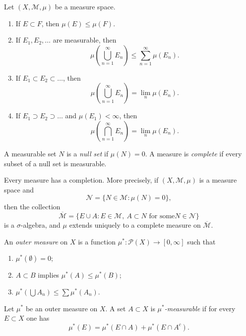 \begin{lemma}
\label{lemma-basic-properties-measures}
Let $(X,\mathcal M,\mu)$ be a measure space.
\begin{enumerate}
\item If $E \subset F$, then $\mu(E) \leq
\mu(F)$.
\item If $E_1,E_2,\ldots$ are measurable,
then
$$
\mu\left(\bigcup_{n=1}^\infty E_n\right) \leq
\sum_{n=1}^\infty \mu(E_n).
$$
\item If $E_1\subset E_2\subset\ldots$, then
$$
\mu\left(\bigcup_{n=1}^\infty
E_n\right)=\lim_n \mu(E_n).
$$
\item If $E_1\supset E_2\supset\ldots$ and
$\mu(E_1)<\infty$, then
$$
\mu\left(\bigcap_{n=1}^\infty
E_n\right)=\lim_n\mu(E_n).
$$
\end{enumerate}
\end{lemma}

\begin{definition}
\label{definition-null-set-complete-measure}
A measurable set $N$ is a {\it null set} if
$\mu(N)=0$. A measure is {\it complete} if
every subset of a null set is measurable.
\end{definition}

\begin{theorem}
\label{theorem-completion-measure}
Every measure has a completion. More
precisely, if $(X,\mathcal M,\mu)$ is a
measure space and
$$
\mathcal N = \{N\in \mathcal M : \mu(N)=0\},
$$
then the collection
$$
\overline{\mathcal M} = \{E\cup A :
E\in\mathcal M,\ A\subset N \text{ for some
}N\in\mathcal N\}
$$
is a $\sigma$-algebra, and $\mu$ extends
uniquely to a complete measure on
$\overline{\mathcal M}$.
\end{theorem}

\begin{definition}
\label{definition-outer-measure}
An {\it outer measure} on $X$ is a function
$\mu^*:\mathcal P(X)\to[0,\infty]$ such that
\begin{enumerate}
\item $\mu^*(\emptyset)=0$;
\item $A\subset B$ implies
$\mu^*(A)\leq\mu^*(B)$;
\item $\mu^*(\bigcup A_n)\leq \sum
\mu^*(A_n)$.
\end{enumerate}
\end{definition}

\begin{definition}
\label{definition-carath-measurable}
Let $\mu^*$ be an outer measure on $X$. A set
$A\subset X$ is {\it $\mu^*$-measurable} if
for every $E\subset X$ one has
$$
\mu^*(E)=\mu^*(E\cap A)+\mu^*(E\cap A^c).
$$
\end{definition}

